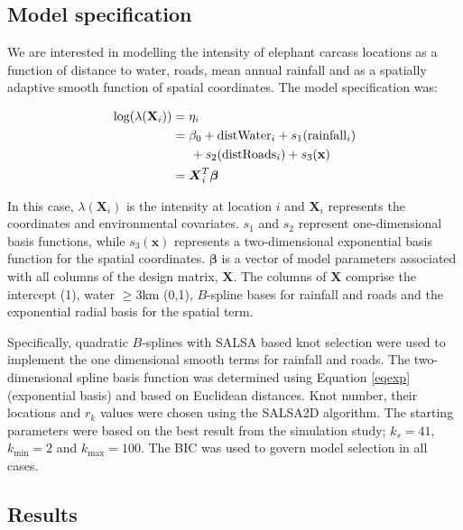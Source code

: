 \documentclass[letterpaper]{interact}
\begin{document}
\subsection{Model specification}\label{model-specification-1}

We are interested in modelling the intensity of elephant carcass locations as a function of distance to water, roads, mean annual rainfall and as a spatially adaptive smooth function of spatial coordinates. The model specification was:

\begin{equation*}
\begin{split}
\textrm{log}(\lambda(\textbf{X}_i)) & = \eta_{i}\\
& =\beta_0 + \textrm{distWater}_i + s_1(\textrm{rainfall}_i)\\
& \hspace{0.5cm} + s_2(\textrm{distRoads}_i) + s_3(\mathbf{x})\\
&  = \boldsymbol{X}_i^T \boldsymbol{\beta}
\end{split}
\end{equation*}


In this case, \(\lambda(\textbf{X}_i)\) is the intensity at location $i$ and $\textbf{X}_i$ represents the coordinates and environmental covariates. $s_1$ and $s_2$ represent one-dimensional basis functions, while $s_3(\mathbf{x})$ represents a two-dimensional exponential basis function for the spatial coordinates. $\boldsymbol{\beta}$ is a vector of model parameters associated with all columns of the design matrix, $\mathbf{X}$. The columns of $\mathbf{X}$ comprise the intercept (1), water $\geq3$km (0,1), $B$-spline bases for rainfall and roads and the exponential radial basis for the spatial term. 

Specifically, quadratic $B$-splines with SALSA based knot selection \cite{Walk2010} were used to implement the one dimensional smooth terms for rainfall and roads. The two-dimensional spline basis function was determined using Equation \ref{eqexp} (exponential basis) and based on Euclidean distances. Knot number, their locations and \(r_k\) values were chosen using the SALSA2D algorithm. The starting parameters were based on the best result from the simulation study; \(k_s = 41\), \(k_{\textrm{min}}=2\) and \(k_{\textrm{max}}=100\). The BIC was used to govern model selection in all cases. 


\subsection{Results}\label{results-1}
\end{document}
